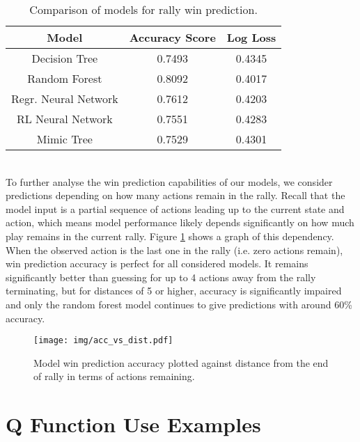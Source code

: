 \documentclass{sfuthesis}
\begin{document}
	\begin{table}
		\centering
		\begin{tabular}{c|cc}
			\textbf{Model} & \textbf{Accuracy Score} & \textbf{Log Loss} \\ \hline
			Decision Tree  & 0.7493                  & 0.4345            \\
			Random Forest  & 0.8092                  & 0.4017            \\
			Regr. Neural Network & 0.7612                  & 0.4203        \\
			RL Neural Network & 0.7551                  & 0.4283            \\
			Mimic Tree     & 0.7529                  & 0.4301           
		\end{tabular}
		\caption{Comparison of models for rally win prediction.}
		\label{tab:class_accuracy}
	\end{table}
	\\To further analyse the win prediction capabilities of our models, we consider predictions depending on how many actions remain in the rally. Recall that the model input is a partial sequence of actions leading up to the current state and action, which means model performance likely depends significantly on how much play remains in the current rally. Figure \ref{fig:acc-vs-dist} shows a graph of this dependency. When the observed action is the last one in the rally (i.e. zero actions remain), win prediction accuracy is perfect for all considered models. It remains significantly better than guessing for up to 4 actions away from the rally terminating, but for distances of 5 or higher, accuracy is significantly impaired and only the random forest model continues to give predictions with around 60\% accuracy.
	\begin{figure}
		\texttt{[image: img/acc\_vs\_dist.pdf]}
		\caption{Model win prediction accuracy plotted against distance from the end of rally in terms of actions remaining.}
		\label{fig:acc-vs-dist}
	\end{figure}
	
	\chapter{Q Function Use Examples}
\end{document}
